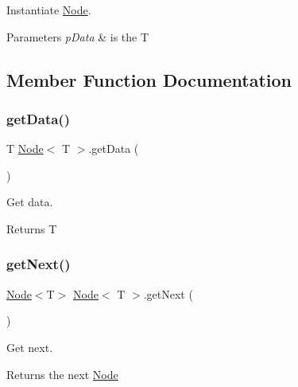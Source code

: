 Instantiate \mbox{\hyperlink{class_node}{Node}}.


\begin{DoxyParams}{Parameters}
{\em p\+Data} & is the T \\
\hline
\end{DoxyParams}


\subsection{Member Function Documentation}
\mbox{\label{class_node_ab2b3d985988d010de2e125417c04d063}} 
\subsubsection{\texorpdfstring{get\+Data()}{getData()}}
{\footnotesize\ttfamily T \mbox{\hyperlink{class_node}{Node}}$<$ T $>$.get\+Data (\begin{DoxyParamCaption}{ }\end{DoxyParamCaption})\hspace{0.3cm}{\ttfamily [inline]}}

Get data.

\begin{DoxyReturn}{Returns}
T 
\end{DoxyReturn}
\mbox{\label{class_node_a2ec63a299666383d35bdde247fb7fb67}} 
\subsubsection{\texorpdfstring{get\+Next()}{getNext()}}
{\footnotesize\ttfamily \mbox{\hyperlink{class_node}{Node}}$<$T$>$ \mbox{\hyperlink{class_node}{Node}}$<$ T $>$.get\+Next (\begin{DoxyParamCaption}{ }\end{DoxyParamCaption})\hspace{0.3cm}{\ttfamily [inline]}}

Get next.

\begin{DoxyReturn}{Returns}
the next \mbox{\hyperlink{class_node}{Node}} 
\end{DoxyReturn}
\mbox{\label{class_node_ad5da4ea9b4329014fa04989d77aa8fab}} 
